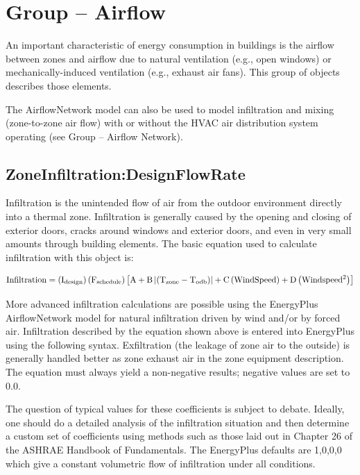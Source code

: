 \section{Group -- Airflow}\label{group-airflow}

An important characteristic of energy consumption in buildings is the airflow between zones and airflow due to natural ventilation (e.g., open windows) or mechanically-induced ventilation (e.g., exhaust air fans). This group of objects describes those elements.

The AirflowNetwork model can also be used to model infiltration and mixing (zone-to-zone air flow) with or without the HVAC air distribution system operating (see Group -- Airflow Network).

\subsection{ZoneInfiltration:DesignFlowRate}\label{zoneinfiltrationdesignflowrate}

Infiltration is the unintended flow of air from the outdoor environment directly into a thermal zone. Infiltration is generally caused by the opening and closing of exterior doors, cracks around windows and exterior doors, and even in very small amounts through building elements. The basic equation used to calculate infiltration with this object is:

\begin{equation}
  \rm{Infiltration} = \left( {{I_{design}}} \right)\left( {{F_{schedule}}} \right)\left[ {A + B\left| {\left( {{T_{zone}} - {T_{odb}}} \right)} \right| + C\left( {WindSpeed} \right) + D\left( {Windspee{d^2}} \right)} \right]
\end{equation}

More advanced infiltration calculations are possible using the EnergyPlus AirflowNetwork model for natural infiltration driven by wind and/or by forced air. Infiltration described by the equation shown above is entered into EnergyPlus using the following syntax. Exfiltration (the leakage of zone air to the outside) is generally handled better as zone exhaust air in the zone equipment description. The equation must always yield a non-negative results; negative values are set to 0.0.

The question of typical values for these coefficients is subject to debate. Ideally, one should do a detailed analysis of the infiltration situation and then determine a custom set of coefficients using methods such as those laid out in Chapter 26 of the ASHRAE Handbook of Fundamentals. The EnergyPlus defaults are 1,0,0,0 which give a constant volumetric flow of infiltration under all conditions.

